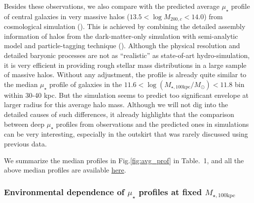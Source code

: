 \documentclass{emulateapj}
\def\mtot{{$M_{\star,100\mathrm{kpc}}$}}
\def\logmtot{{$\log (M_{\star,100\mathrm{kpc}}/M_{\odot})$}}
\def\mden{{$\mu_{\star}$}}
\begin{document}
\begin{CJK*}{UTF8}{gbsn}
    Besides these observations, we also compare with the predicted average \mden{} 
    profile of central galaxies in very massive halos 
    ($13.5 < \log M_{200,c} < 14.0$) from cosmological simulation (\citealt{Cooper13}). 
    This is achieved by combining the detailed assembly information of halos from the 
    dark-matter-only simulation with semi-analytic model and particle-tagging technique 
    (\citealt{Cooper10}).
    Although the physical resolution and detailed baryonic processes are not as 
    ``realistic'' as state-of-art hydro-simulation, it is very efficient in providing 
    rough stellar mass distributions in a large sample of massive halos. 
    Without any adjustment, the profile is already quite similar to the median \mden{}
    profile of galaxies in the $11.6 <$\logmtot{}$< 11.8$ bin within 30-40 kpc. 
    But the simulation seems to predict too significant envelope at larger radius for 
    this average halo mass. 
    Although we will not dig into the detailed causes of such differences, it already 
    highlights that the comparison between deep \mden{} profiles from observations 
    and the predicted ones in simulations can be very interesting, especially in the 
    outskirt that was rarely discussed using previous data. 
    
    We summarize the median profiles in Fig.\ref{fig:avg_prof} in Table.~1,
    and all the above median profiles are available  
    \href{https://github.com/dr-guangtou/hsc_cenHighMh/tree/master/profiles}{here}.


\subsubsection{Environmental dependence of \mden{} profiles at fixed \mtot{}}
    \label{sssec:sbp_mtot}    


\end{CJK*}
\end{document}
